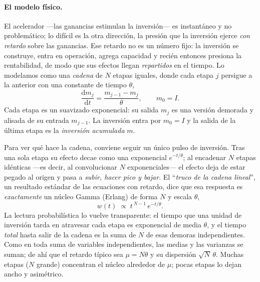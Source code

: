 \documentclass[11pt]{article}
\begin{document}
\paragraph{El modelo físico.} El acelerador ---las ganancias estimulan la inversión--- es
instantáneo y no problemático; lo difícil es la otra dirección, la presión que la inversión ejerce
\emph{con retardo} sobre las ganancias. Ese retardo no es un número fijo: la inversión se construye,
entra en operación, agrega capacidad y recién entonces presiona la rentabilidad, de modo que sus
efectos llegan \emph{repartidos} en el tiempo. Lo modelamos como una \emph{cadena} de $N$ etapas
iguales, donde cada etapa $j$ persigue a la anterior con una constante de tiempo $\theta$,
\[
\frac{\mathrm{d}m_j}{\mathrm{d}t}=\frac{m_{j-1}-m_j}{\theta},\qquad m_0=I.
\]
Cada etapa es un suavizado exponencial: su salida $m_j$ es una versión demorada y alisada de su
entrada $m_{j-1}$. La inversión entra por $m_0=I$ y la salida de la última etapa es la
\emph{inversión acumulada} $m$.

Para ver qué hace la cadena, conviene seguir un único pulso de inversión. Tras una sola etapa su
efecto decae como una exponencial $e^{-t/\theta}$; al encadenar $N$ etapas idénticas ---es decir, al
convolucionar $N$ exponenciales--- el efecto deja de estar pegado al origen y pasa a \emph{subir,
hacer pico y bajar}. El ``\emph{truco de la cadena lineal}'', un resultado estándar de las ecuaciones
con retardo, dice que esa respuesta es \emph{exactamente} un núcleo Gamma (Erlang) de forma $N$ y
escala $\theta$,
\[
w(t)\;\propto\;t^{\,N-1}\,e^{-t/\theta}.
\]
La lectura probabilística lo vuelve transparente: el tiempo que una unidad de inversión tarda en
atravesar cada etapa es exponencial de media $\theta$, y el tiempo \emph{total} hasta salir de la
cadena es la suma de $N$ de esas demoras independientes. Como en toda suma de variables
independientes, las medias y las varianzas se suman; de ahí que el retardo típico sea $\mu=N\theta$ y
su dispersión $\sqrt{N}\,\theta$. Muchas etapas ($N$ grande) concentran el núcleo alrededor de
$\mu$; pocas etapas lo dejan ancho y asimétrico.
\end{document}

